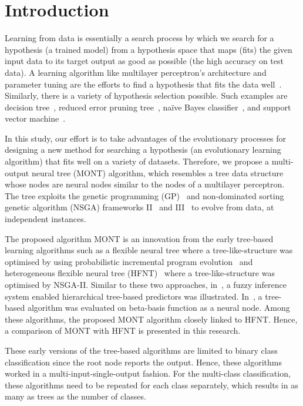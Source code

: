 \documentclass[conference]{IEEEtran}
\begin{document}
\section{Introduction}

Learning from data is essentially a search process by which we search for a hypothesis (a trained model) from a hypothesis space that maps (fits) the given input data to its target  output as good as possible (the high accuracy on test data). A learning algorithm like multilayer perceptron's architecture and parameter tuning are the efforts to find a hypothesis that fits the data well~\cite{annBpRumelhart1986,ojha2017metaheuristic}. Similarly, there is a variety of hypothesis selection possible. Such examples are decision tree~\cite{quinlan2014c4}, reduced error pruning tree~\cite{kohavi2002data}, na\"{i}ve Bayes classifier~\cite{john1995estimating}, and support vector machine~\cite{chang2011libsvm}.

In this study, our effort is to take advantages of the evolutionary processes for designing a new method for searching a hypothesis (an evolutionary learning algorithm) that fits well on a variety of datasets. Therefore, we propose a multi-output neural tree (MONT) algorithm, which resembles a tree data structure whose nodes are neural nodes similar to the nodes of a multilayer perceptron. The tree exploits the genetic programming (GP)~\cite{schmidt2009solving} and non-dominated sorting genetic algorithm (NSGA) frameworks II~\cite{deb2000fast} and III~\cite{deb2013evolutionary} to evolve from data, at independent instances.

The proposed algorithm MONT is an innovation from the early tree-based learning algorithms such as a flexible neural tree where a tree-like-structure was optimised by using probabilistic incremental program evolution~\cite{chen2005time} and heterogeneous flexible neural tree (HFNT)~\cite{ojha2017ensemble} where a tree-like-structure was optimised by NSGA-II. Similar to these two approaches, in~\cite{ojha2017multiobjective}, a fuzzy inference system enabled hierarchical tree-based predictors was illustrated. In~\cite{bouaziz2013hybrid}, a tree-based algorithm was evaluated on beta-basis function as a neural node. Among these algorithms, the proposed MONT algorithm closely linked to HFNT. Hence, a comparison of MONT with HFNT is presented in this research. 

These early versions of the tree-based algorithms are limited to binary class classification since the root node reports the output. Hence, these algorithms worked in a multi-input-single-output fashion. For the multi-class classification, these algorithms need to be repeated for each class separately, which results in as many as trees as the number of classes. 
\end{document}
